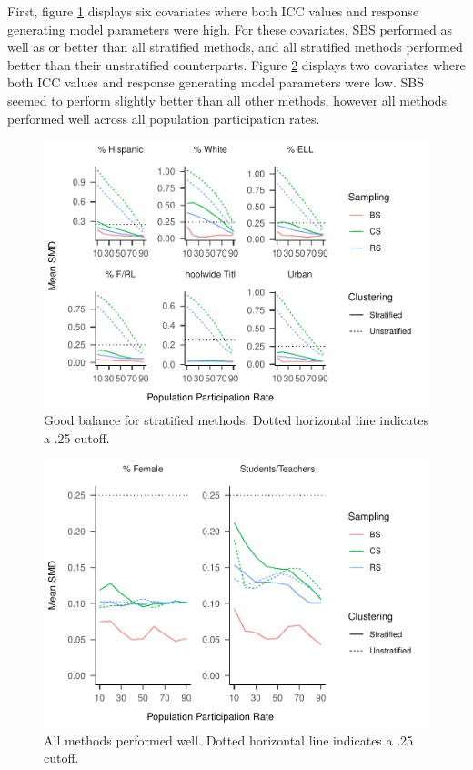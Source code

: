 \documentclass[man,floatsintext]{apa6}
\begin{document}
First, figure \ref{fig:fig-SMD-by-Var-good1} displays six covariates where both ICC values and response generating model parameters were high. For these covariates, SBS performed as well as or better than all stratified methods, and all stratified methods performed better than their unstratified counterparts. Figure \ref{fig:fig-SMD-by-Var-neutral} displays two covariates where both ICC values and response generating model parameters were low. SBS seemed to perform slightly better than all other methods, however all methods performed well across all population participation rates.



\begin{figure}
\centering
\includegraphics{GenSamp_Paper_files/figure-latex/fig-SMD-by-Var-good1-1.pdf}
\caption{\label{fig:fig-SMD-by-Var-good1}Good balance for stratified methods. Dotted horizontal line indicates a .25 cutoff.}
\end{figure}



\begin{figure}
\centering
\includegraphics{GenSamp_Paper_files/figure-latex/fig-SMD-by-Var-neutral-1.pdf}
\caption{\label{fig:fig-SMD-by-Var-neutral}All methods performed well. Dotted horizontal line indicates a .25 cutoff.}
\end{figure}
\end{document}

